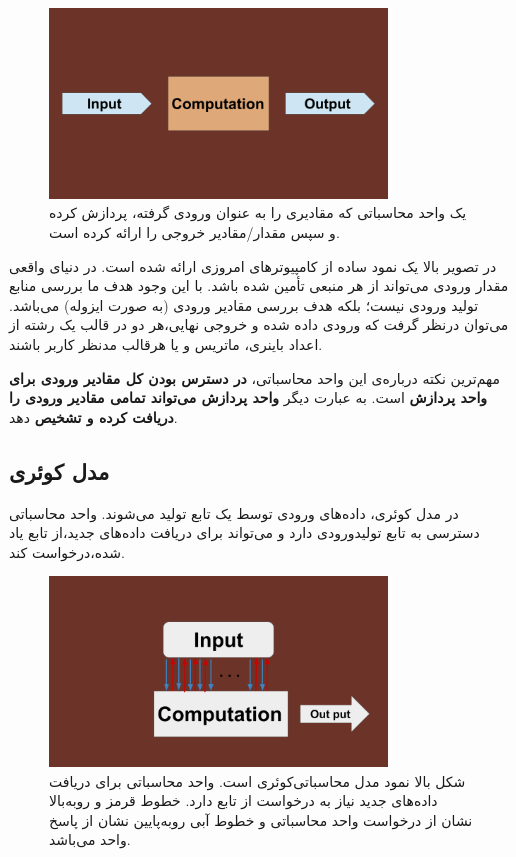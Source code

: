 \documentclass{book}
\begin{document}
\begin{figure}[ht]
	\centering
	\includegraphics[width=0.8\textwidth]{standard computation model.png}
	\caption{یک واحد محاسباتی که مقادیری را به عنوان ورودی گرفته، پردازش کرده و سپس مقدار/مقادیر خروجی را ارائه کرده است.}
\end{figure}


در تصویر بالا یک نمود ساده از کامپیوتر‌های امروزی ارائه شده است. در دنیای واقعی مقدار ورودی می‌تواند از هر منبعی‌ تأمین شده باشد. با این وجود هدف ما بررسی منابع تولید ورودی نیست؛‌ بلکه هدف بررسی مقادیر ورودی (به صورت ایزوله) می‌باشد. می‌توان درنظر گرفت که ورودی داده شده و خروجی نهایی،‌هر دو در قالب یک رشته از اعداد باینری، ماتریس و یا هرقالب مدنظر کاربر باشند.

مهم‌ترین نکته درباره‌ی این واحد محاسباتی،‌ \textbf{در دسترس بودن کل مقادیر ورودی برای واحد پردازش} است. به عبارت دیگر\textbf{ واحد پردازش می‌تواند تمامی مقادیر ورودی را دریافت کرده و تشخیص} دهد. 

\subsection{مدل کوئری}
در مدل کوئری، داده‌های ورودی توسط یک تابع تولید می‌شوند. واحد محاسباتی دسترسی به تابع تولیدورودی دارد و می‌تواند برای دریافت داده‌های جدید،‌از تابع یاد شده،‌درخواست کند.

\begin{figure}[ht]
	\centering
	\includegraphics[width=0.8\textwidth]{Query computation model.png}
	\caption{شکل بالا نمود مدل محاسباتی‌کوئری است. واحد محاسباتی برای دریافت داده‌های جدید نیاز به درخواست از تابع  دارد. خطوط قرمز و روبه‌بالا نشان از درخواست واحد محاسباتی و خطوط آبی روبه‌پایین نشان از پاسخ واحد می‌باشد.}
\end{figure}
\end{document}
